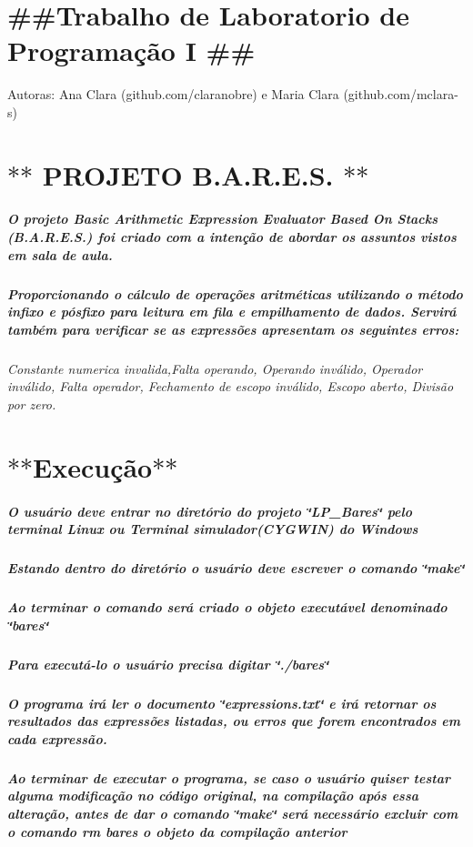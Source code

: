 \section*{\#\#\+Trabalho de Laboratorio de Programação I \#\#}

Autoras\+: Ana Clara (github.\+com/claranobre) e Maria Clara (github.\+com/mclara-\/s)

\section*{$\ast$$\ast$ P\+R\+O\+J\+E\+T\+O B.\+A.\+R.\+E.\+S. $\ast$$\ast$}

\subparagraph*{O projeto Basic Arithmetic Expression Evaluator Based On Stacks (B.\+A.\+R.\+E.\+S.) foi criado com a intenção de abordar os assuntos vistos em sala de aula.}

\subparagraph*{Proporcionando o cálculo de operações aritméticas utilizando o método infixo e pósfixo para leitura em fila e empilhamento de dados. Servirá também para verificar se as expressões apresentam os seguintes erros\+:}

{\itshape Constante numerica invalida,Falta operando, Operando inválido, Operador inválido, Falta operador, Fechamento de escopo inválido, Escopo aberto, Divisão por zero.}

\section*{$\ast$$\ast$\+Execução$\ast$$\ast$}

\subparagraph*{O usuário deve entrar no diretório do projeto \char`\"{}\+L\+P\+\_\+\+Bares\char`\"{} pelo terminal Linux ou Terminal simulador(\+C\+Y\+G\+W\+I\+N) do Windows}

\subparagraph*{Estando dentro do diretório o usuário deve escrever o comando \char`\"{}make\char`\"{}}

\subparagraph*{Ao terminar o comando será criado o objeto executável denominado \char`\"{}bares\char`\"{}}

\subparagraph*{Para executá-\/lo o usuário precisa digitar \char`\"{}./bares\char`\"{}}

\subparagraph*{O programa irá ler o documento \char`\"{}expressions.\+txt\char`\"{} e irá retornar os resultados das expressões listadas, ou erros que forem encontrados em cada expressão.}

\subparagraph*{Ao terminar de executar o programa, se caso o usuário quiser testar alguma modificação no código original, na compilação após essa alteração, antes de dar o comando \char`\"{}make\char`\"{} será necessário excluir com o comando {\itshape rm bares} o objeto da compilação anterior}

